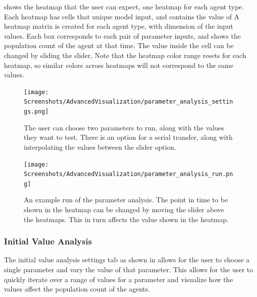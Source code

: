  shows the heatmap that the user can expect, one heatmap for each agent type. 
Each heatmap has cells that unique model input, and contains the value of
A heatmap matrix is created for each agent type, with dimension of the input values. 
Each box corresponds to each pair of parameter inputs, and shows the population count of the agent at that time. 
The value inside the cell can be changed by sliding the slider, 
Note that the heatmap color range resets for each heatmap, so similar colors across heatmaps will not correspond to the same values. 
\begin{figure}
    \centering
    \texttt{[image: Screenshots/AdvancedVisualization/parameter\_analysis\_settings.png]}
    \caption{
        The user can choose two parameters to run, along with the values they want to test. 
        There is an option for a serial transfer, along with interpolating the values between the slider option. 
    }
    \label{fig:ss:av:parameter_analysis_settings}
\end{figure}
\begin{figure}
    \centering
    \texttt{[image: Screenshots/AdvancedVisualization/parameter\_analysis\_run.png]}
    \caption{
        An example run of the parameter analysis. 
        The point in time to be shown in the heatmap can be changed by moving the slider above the heatmaps. 
        This in turn affects the value shown in the heatmap. 
    }
    \label{fig:ss:av:parameter_analysis_run}
\end{figure}

\subsubsection{Initial Value Analysis}
The initial value analysis settings tab as shown in allows for the user to choose a single parameter and vary the value of that parameter. 
This allows for the user to quickly iterate over a range of values for a parameter and visualize how the values affect the population count of the agents. 

